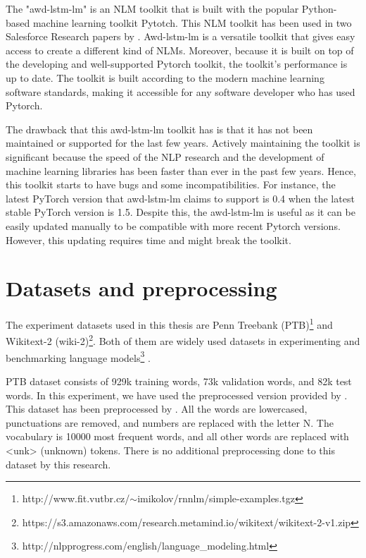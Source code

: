 The "awd-lstm-lm" is an NLM toolkit that is built with the popular Python-based machine learning toolkit Pytotch. This NLM toolkit has been used in two Salesforce Research papers by \textcite{merity2017regularizing,merity2018analysis}. Awd-lstm-lm is a versatile toolkit that gives easy access to create a different kind of NLMs. Moreover, because it is built on top of the developing and well-supported Pytorch toolkit, the toolkit's performance is up to date. The toolkit is built according to the modern machine learning software standards, making it accessible for any software developer who has used Pytorch.

The drawback that this awd-lstm-lm toolkit has is that it has not been maintained or supported for the last few years. Actively maintaining the toolkit is significant because the speed of the NLP research and the development of machine learning libraries has been faster than ever in the past few years. Hence, this toolkit starts to have bugs and some incompatibilities. For instance, the latest PyTorch version that awd-lstm-lm claims to support is 0.4 when the latest stable PyTorch version is 1.5. Despite this, the awd-lstm-lm is useful as it can be easily updated manually to be compatible with more recent Pytorch versions. However, this updating requires time and might break the toolkit.


\section{Datasets and preprocessing}

The experiment datasets used in this thesis are Penn Treebank (PTB)\footnote{http://www.fit.vutbr.cz/$\sim$imikolov/rnnlm/simple-examples.tgz} and Wikitext-2 (wiki-2)\footnote{https://s3.amazonaws.com/research.metamind.io/wikitext/wikitext-2-v1.zip}. Both of them are widely used datasets in experimenting \parencite{merity2017regularizing,yang2017breaking} and benchmarking language models\footnote{http://nlpprogress.com/english/language\_modeling.html} \parencite{ruder2020Language}.

PTB dataset consists of 929k training words, 73k validation words, and 82k test words. In this experiment, we have used the preprocessed version provided by \textcite{mikolov2010recurrent}. This dataset has been preprocessed by \textcite{mikolov2010recurrent}. All the words are lowercased, punctuations are removed, and numbers are replaced with the letter N. The vocabulary is 10000 most frequent words, and all other words are replaced with <unk> (unknown) tokens. There is no additional preprocessing done to this dataset by this research.

